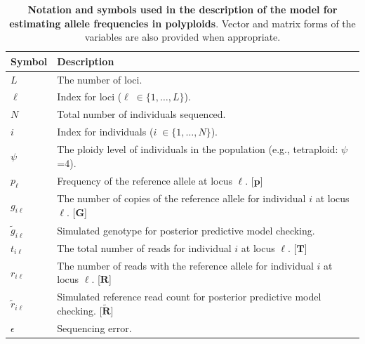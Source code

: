 \documentclass[11pt,english,letterpaper,oneside]{article}
\begin{document}
\begin{table}
\centering
{}
\caption{\textbf{Notation and symbols used in the description of the model for estimating allele frequencies in polyploids}. Vector and matrix forms of the variables are also provided when appropriate. }
\vspace{0.25in}
\bgroup
\def\arraystretch{1.45}
\begin{tabular}[l]{l | l}
\hline
\textbf{Symbol} & \textbf{Description}\\ \hline
$L$ & The number of loci. \\
$\ell$ & Index for loci ($\ell\; \in \{1,\ldots,L\}$). \\
$N$ & Total number of individuals sequenced. \\
$i$ & Index for individuals ($i\; \in \{1,\ldots,N\}$). \\
$\psi$ & The ploidy level of individuals in the population (e.g., tetraploid: $\psi$=4). \\
$p_{\ell}$ & Frequency of the reference allele at locus $\ell$. [$\bm{p}$] \\
$g_{i \ell}$ & The number of copies of the reference allele for individual $i$ at locus $\ell$. [$\bm{G}$] \\
$\tilde{g}_{i \ell}$ & Simulated genotype for posterior predictive model checking. \\
$t_{i \ell}$ & The total number of reads for individual $i$ at locus $\ell$. [$\bm{T}$] \\
$r_{i \ell}$ & The number of reads with the reference allele for individual $i$ at locus $\ell$. [$\bm{R}$] \\
$\tilde{r}_{i \ell}$ & Simulated reference read count for posterior predictive model checking. [$\tilde{\bm{R}}$] \\
$\epsilon$ & Sequencing error. \\
\hline
\end{tabular}
\egroup
\label{table1}
\vspace{0.25in}
\end{table}

\end{document}
